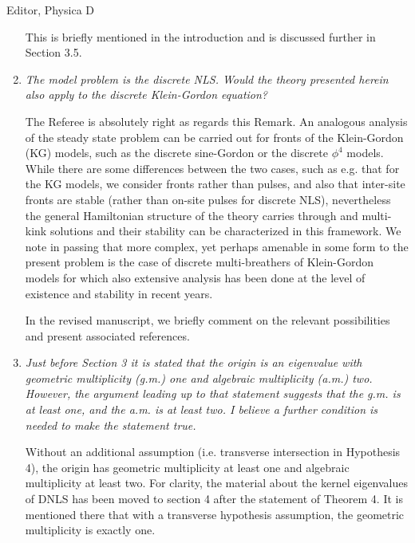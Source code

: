\documentclass[11pt]{letter}
\begin{document}
\begin{letter}{Editor, Physica D}
\begin{enumerate}
\vspace{4mm}
This is briefly mentioned in the introduction and is discussed further in Section 3.5.
\vspace{4mm}

\item \emph{The model problem is the discrete NLS. Would the theory presented herein also apply to the discrete Klein-Gordon equation?}

\vspace{4mm}
The Referee is absolutely right as regards this Remark.
An analogous analysis of the steady state problem can be
carried out for fronts of the Klein-Gordon (KG) models, such as
the discrete sine-Gordon or the discrete $\phi^4$ models. 
While there are some differences between the two cases,
such as e.g. that for the KG models, we consider fronts rather
than pulses, and also that inter-site fronts are stable
(rather than on-site pulses for discrete NLS), nevertheless
the general Hamiltonian structure of the theory carries
through and multi-kink solutions and their stability
can be characterized in this framework. We note in passing that more complex, yet perhaps amenable
in some form to the present problem is the case of discrete
multi-breathers of Klein-Gordon models for which also 
extensive analysis has been done at the level of existence
and stability in recent years. 

In the revised manuscript, we briefly comment on the 
relevant possibilities and present associated references.
\vspace{4mm}

\item \emph{Just before Section 3 it is stated that the origin is an eigenvalue with geometric multiplicity (g.m.) one and algebraic multiplicity (a.m.) two. However, the argument leading up to that statement suggests that the g.m. is at least one, and the a.m. is at least two. I believe a further condition is needed to make the statement true.}

\vspace{4mm}
Without an additional assumption (i.e. transverse intersection in Hypothesis 4), the origin has geometric multiplicity at least one and algebraic multiplicity at least two. For clarity, the material about the kernel eigenvalues of DNLS has been moved to section 4 after the statement of Theorem 4. It is  mentioned there that with a transverse hypothesis assumption, the geometric multiplicity is exactly one.
\vspace{4mm}


\end{enumerate}
\end{letter}
\end{document}
